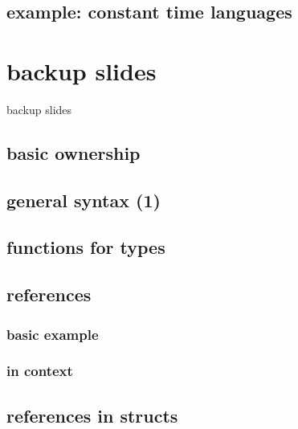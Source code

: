 \subsection{example: constant time languages}




\section{backup slides}
\begin{frame}{backup slides}
\end{frame}
\subsection{basic ownership}

\subsection{general syntax (1)}


\subsection{functions for types}


\subsection{references}
\subsubsection{basic example}


\subsubsection{in context}


\subsection{references in structs}



